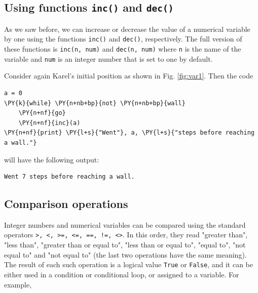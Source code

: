 \subsection[\ \ Using functions {\tt inc()} and {\tt dec()}]{Using functions {\tt inc()} and {\tt dec()}}\label{subsec:incdec}

As we saw before, we can increase or decrease the value of a numerical 
variable by one using the functions {\tt inc()} and 
{\tt dec()}, respectively. The full version of these functions 
is {\tt inc(n, num)} and {\tt dec(n, num)} where {\tt n} is the 
name of the variable and {\tt num} is 
an integer number that is set to one by default.

Consider again Karel's initial position as shown 
in Fig. \ref{fig:var1}. Then the code\\

\begin{bbox}
\begin{Verbatim}[commandchars=\\\{\}]
a = 0
\PY{k}{while} \PY{n+nb+bp}{not} \PY{n+nb+bp}{wall}
    \PY{n+nf}{go}
    \PY{n+nf}{inc}(a)
\PY{n+nf}{print} \PY{l+s}{"Went"}, a, \PY{l+s}{"steps before reaching a wall."}
\end{Verbatim}
\end{bbox}
\vspace{6mm}

\noindent
will have the following output:\\

\begin{ybox}
\begin{verbatim}
Went 7 steps before reaching a wall.
\end{verbatim}
\end{ybox}
\vspace{6mm}

\subsection[\ \ Comparison operations]{Comparison operations}

Integer numbers and numerical variables can be compared using the 
standard operators {\tt >, <, >=, <=, ==, !=, <>}. In this order, 
they read "greater than", "less than", "greater than or equal to", 
"less than or equal to", "equal to", "not equal to" and "not equal to"
(the last two operations have the same meaning). The result of each such 
operation is a logical value {\tt True} or {\tt False}, and it can be 
either used in a condition or conditional loop, or assigned to 
a variable. For example,\\

